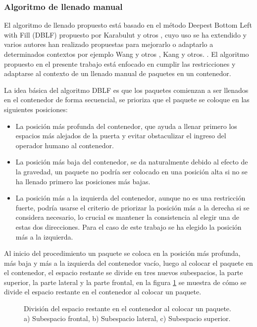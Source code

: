 \subsubsection{Algoritmo de llenado manual}

El algoritmo de llenado propuesto está basado en el método Deepest Bottom Left with Fill (DBLF) propuesto por Karabulut y otros \cite{karabulut2004hybrid}, cuyo uso se ha extendido y varios autores han realizado propuestas para mejorarlo o adaptarlo a determinados contextos por ejemplo Wang y otros \cite{wang2010hybrid}, Kang y otros. \cite{kang2012hybrid}. El algoritmo propuesto en el presente trabajo está enfocado en cumplir las restricciones y adaptarse al contexto de un llenado manual de paquetes en un contenedor.

La idea básica del algoritmo DBLF es que los paquetes comienzan a ser llenados en el contenedor de forma secuencial, se prioriza que el paquete se coloque en las siguientes posiciones:

\begin{itemize}
    \item La posición más profunda del contenedor, que ayuda a llenar primero los espacios más alejados de la puerta y evitar obstaculizar el ingreso del operador humano al contenedor.
    \item La posición más baja del contenedor, se da naturalmente debido al efecto de la gravedad, un paquete no podría ser colocado en una posición alta si no se ha llenado primero las posiciones más bajas.
    \item La posición más a la izquierda del contenedor, aunque no es una restricción fuerte, podría usarse el criterio de priorizar la posición más a la derecha si se considera necesario, lo crucial es mantener la consistencia al elegir una de estas dos direcciones. Para el caso de este trabajo se ha elegido la posición más a la izquierda.
\end{itemize}

Al inicio del procedimiento un paquete se coloca en la posición más profunda, más baja y más a la izquierda del contenedor vacío, luego al colocar el paquete en el contenedor, el espacio restante se divide en tres nuevos subespacios, la parte superior, la parte lateral y la parte frontal, en la figura \ref{fig:subespacios} se muestra de cómo se divide el espacio restante en el contenedor al colocar un paquete.

\begin{figure}[H]
    \centering
    
    \caption{División del espacio restante en el contenedor al colocar un paquete. a) Subespacio frontal, b) Subespacio lateral, c) Subespacio superior.}
    \label{fig:subespacios}
\end{figure}

